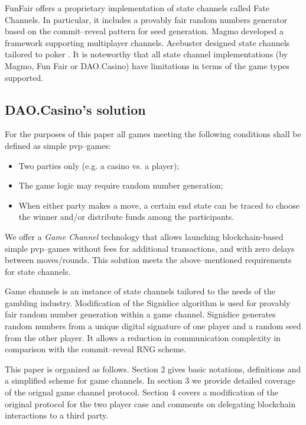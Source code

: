 	FunFair \cite{bib15} offers a proprietary implementation of state channels called Fate Channels. In particular, it includes a provably fair random numbers generator based on the commit--reveal pattern for seed generation. Magmo \cite{bib16} developed a framework supporting multiplayer channels. Acebuster designed state channels tailored to poker \cite{bib17}. It is noteworthy that all state channel implementations (by Magmo, Fun Fair or DAO.Casino) have limitations in terms of the game types supported.

		\subsection {DAO.Casino's solution}
	For the purposes of this paper all games meeting the following conditions shall be defined as simple pvp--games:
	\begin{itemize}
		\item Two parties only (e.g. a casino vs. a player);
		\item The game logic may require random number generation;
		\item When either party makes a move, a certain end state can be traced to choose the winner and/or distribute funds among the participants.
	\end{itemize}
	We offer a \textit {Game Channel} technology that allows launching blockchain-based simple pvp--games without fees for additional transactions, and with zero delays between moves/rounds. This solution meets the above--mentioned requirements for state channels.

	Game channels is an instance of state channels tailored to the needs of the gambling industry. Modification of the Signidice \cite{bib18} algorithm is used for provably fair random number generation within a game channel. Signidice generates random numbers from a unique digital signature of one player and a random seed from the other player. It allows a reduction in communication complexity in comparison with the commit--reveal RNG scheme. 

This paper is organized as follows. Section 2 gives basic notations, definitions and a simplified scheme for game channels. In section 3 we provide detailed coverage of the orignal game channel protocol. Section 4 covers a modification of the original protocol for the two player case and comments on delegating blockchain interactions to a third party.